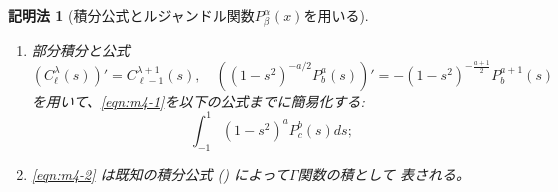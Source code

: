 \documentclass[12pt,a4paper,dvipdfmx]{jsarticle}
\numberwithin{equation}{section}
\theoremstyle{jplain}
\newtheorem{method}{記明法}
\theoremstyle{remark}
\theoremstyle{definition}
\begin{document}
{\begin{method}[積分公式とルジャンドル関数$ P^\alpha_\beta(x)$を用いる]
\begin{enumerate}
		\item 部分積分と公式
			\begin{equation*}
				\left(C^\lambda_\ell(s)  \right)'=C^{\lambda+1}_{\ell-1}(s),\quad\left((1-s^2)^{-a/2}P^a_b(s) \right)'
			=-(1-s^2)^{-\frac{a+1}{2}}P_b^{a+1}(s)
			\end{equation*}
			を用いて、\eqref{eqn:m4-1}を以下の公式までに簡易化する:
			\begin{equation}\label{eqn:m4-2}
				\int_{-1}^1(1-s^2)^aP^b_c(s)ds;
			\end{equation}
			
		\item \eqref{eqn:m4-2} は既知の積分公式 (\cite[(7.3.4)]{kobayashi2011schrodinger}) によって$\Gamma$関数の積として
			表される。
	\end{enumerate}
\end{method}
}
\end{document}
